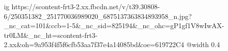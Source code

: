  
 
 
 
 

\ifcmt
  ig https://scontent-frt3-2.xx.fbcdn.net/v/t39.30808-6/250351382_251770036989020_6875137363834893958_n.jpg?_nc_cat=101&ccb=1-5&_nc_sid=825194&_nc_ohc=gP1gf1V8wIwAX-tr0LM&_nc_ht=scontent-frt3-2.xx&oh=9a953f4f5f6cfb53aa7f37e4a14085bd&oe=619722C4
  @width 0.4
\fi
